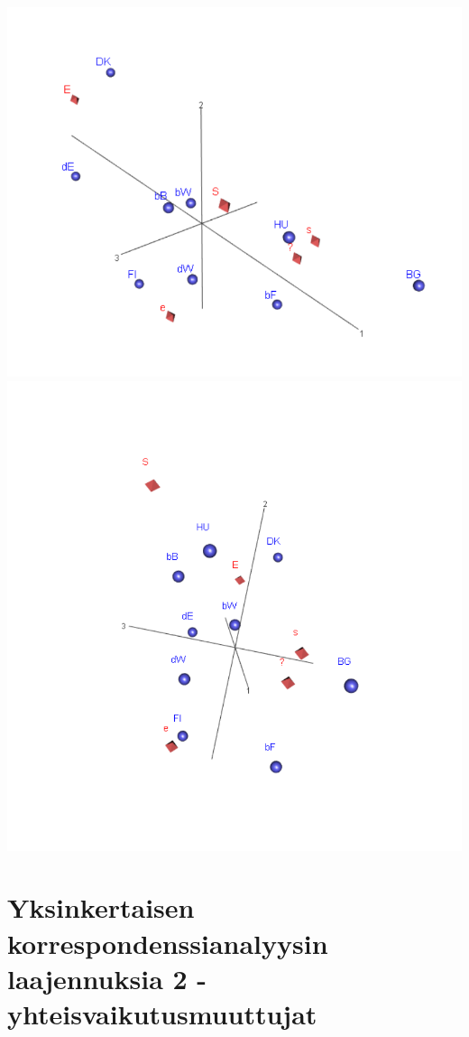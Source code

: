 \documentclass[
  finnish,
]{book}
\begin{document}
\includegraphics[width=11.07in]{img/3dSymMap_1}
\includegraphics[width=12.36in]{img/3dSymMap_2}

\hypertarget{yksinkertaisen-korrespondenssianalyysin-laajennuksia-2---yhteisvaikutusmuuttujat}{%
\chapter{Yksinkertaisen korrespondenssianalyysin laajennuksia 2 -
yhteisvaikutusmuuttujat}\label{yksinkertaisen-korrespondenssianalyysin-laajennuksia-2---yhteisvaikutusmuuttujat}}
\end{document}
